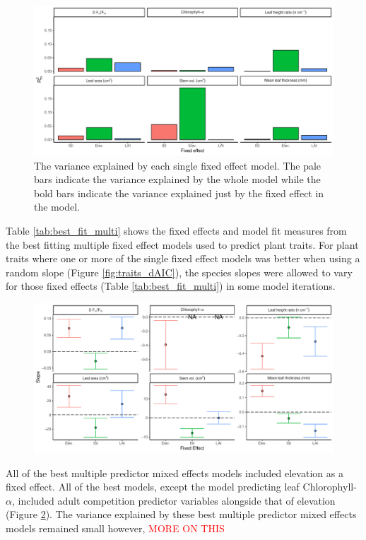 \documentclass[a4paper, 11pt]{article}
\newcommand{\todo}[1]{\textcolor{red}{#1}}   %
\begin{document}
\begin{figure}[H]
\includegraphics[width=\textwidth]{single_pred_r2m}
\centering
\caption{The variance explained by each single fixed effect model. The pale bars indicate the variance explained by the whole model while the bold bars indicate the variance explained just by the fixed effect in the model.}
\label{fig:single_pred_r2m}
\end{figure}

Table \ref{tab:best_fit_multi} shows the fixed effects and model fit measures from the best fitting multiple fixed effect models used to predict plant traits. For plant traits where one or more of the single fixed effect models was better when using a random slope (Figure \ref{fig:traits_dAIC}), the species slopes were allowed to vary for those fixed effects (Table \ref{tab:best_fit_multi}) in some model iterations. 

\begin{figure}[H]
\includegraphics[width=\textwidth]{multi_pred_slope}
\centering
\caption{}
\label{multi_pred_slope}
\end{figure}

All of the best multiple predictor mixed effects models included elevation as a fixed effect. All of the best models, except the model predicting leaf Chlorophyll-$\alpha$, included adult competition predictor variables alongside that of elevation (Figure \ref{multi_pred_slope}). The variance explained by these best multiple predictor mixed effects models remained small however, \todo{MORE ON THIS}
\end{document}
